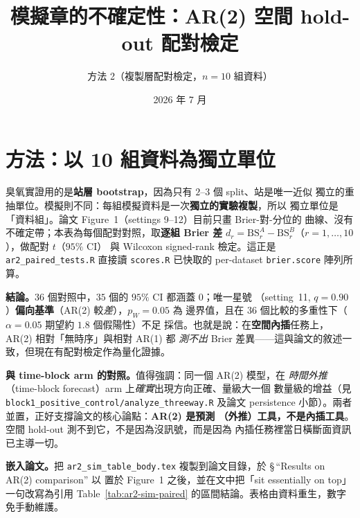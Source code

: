 \documentclass[12pt]{article}
\title{\textbf{模擬章的不確定性：AR(2) 空間 hold-out 配對檢定}}
\author{方法 2（複製層配對檢定，$n=10$ 組資料）}
\date{2026 年 7 月}
\begin{document}
\maketitle

\section*{方法：以 10 組資料為獨立單位}

臭氧實證用的是\textbf{站層 bootstrap}，因為只有 $2$--$3$ 個 split、站是唯一近似
獨立的重抽單位。模擬則不同：每組模擬資料是一次\textbf{獨立的實驗複製}，所以
獨立單位是「資料組」。論文 Figure~1（settings 9--12）目前只畫 Brier-對-分位的
曲線、沒有不確定帶；本表為每個配對對照，取\textbf{逐組 Brier 差}
$d_r = \mathrm{BS}^A_r - \mathrm{BS}^B_r$（$r=1,\dots,10$），做配對 $t$（$95\%$ CI）
與 Wilcoxon signed-rank 檢定。這正是 \verb|ar2_paired_tests.R| 直接讀
\verb|scores.R| 已快取的 per-dataset \verb|brier.score| 陣列所算。

\bigskip


\bigskip
\noindent\textbf{結論。}$36$ 個對照中，$35$ 個的 $95\%$ CI 都涵蓋 $0$；唯一星號
（setting~11, $q{=}0.90$）\textbf{偏向基準}（AR(2) 較\emph{差}），$p_W=0.05$ 為
邊界值，且在 $36$ 個比較的多重性下（$\alpha=0.05$ 期望約 $1.8$ 個假陽性）不足
採信。也就是說：在\textbf{空間內插}任務上，AR(2) 相對「無時序」與相對 AR(1) 都
\emph{測不出} Brier 差異——這與論文的敘述一致，但現在有配對檢定作為量化證據。

\medskip
\noindent\textbf{與 time-block arm 的對照。}值得強調：同一個 AR(2) 模型，在
\emph{時間外推}（time-block forecast）arm 上\emph{確實}出現方向正確、量級大一個
數量級的增益（見 \verb|block1_positive_control/analyze_threeway.R| 及論文
persistence 小節）。兩者並置，正好支撐論文的核心論點：\textbf{AR(2) 是預測
（外推）工具，不是內插工具}。空間 hold-out 測不到它，不是因為沒訊號，而是因為
內插任務裡當日橫斷面資訊已主導一切。

\medskip
\noindent\textbf{嵌入論文。}把 \verb|ar2_sim_table_body.tex| 複製到論文目錄，於
\S\,``Results on AR(2) comparison'' 以 \verb|| 置於
Figure~1 之後，並在文中把「sit essentially on top」一句改寫為引用
Table~\ref{tab:ar2-sim-paired} 的區間結論。表格由資料重生，數字免手動維護。
\end{document}
